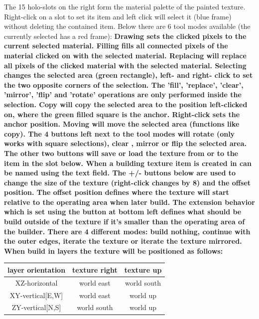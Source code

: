 \documentclass[11pt]{article} %
\begin{document}
The 15 holo-slots on the right form the material palette of the painted texture. Right-click on a slot to set its item and left click will select it (blue frame) without deleting the contained item. Below there are 6 tool modes available (the currently selected has a red frame): \bf Drawing \rm sets the clicked pixels to the current selected material. \bf Filling \rm fills all connected pixels of the material clicked on with the selected material. \bf Replacing \rm will replace all pixels of the clicked material with the selected material. \bf Selecting \rm changes the selected area (green rectangle), left- and right- click to set the two opposite corners of the selection. The 'fill', 'replace', 'clear', 'mirror', 'flip' and 'rotate' operations are only performed inside the selection. \bf Copy \rm will copy the selected area to the position left-clicked on, where the green filled square is the anchor. Right-click sets the anchor position. \bf Moving \rm will move the selected area (functions like copy). The 4 buttons left next to the tool modes will \bf rotate \rm (only works with square selections), \bf clear \rm , \bf mirror \rm or \bf flip \rm the selected area. The other two buttons will save or load the texture from or to the item in the slot below. When a building texture item is created in can be named using the text field. The +/- buttons below are used to change the size of the texture (right-click changes by 8) and the offset position. The offset position defines where the texture will start relative to the operating area when later build. The \bf extension behavior \rm which is set using the button at bottom left defines what should be build outside of the texture if it's smaller than the operating area of the builder. There are 4 different modes: build nothing, continue with the outer edges, iterate the texture or iterate the texture mirrored. \\
When build in layers the texture will be positioned as follows: \\
\begin{tabular}{| c | c | c |} \hline
\bf layer orientation & \bf texture right & \bf texture up \\ \hline
XZ-horizontal & world east & world south \\
XY-vertical[E,W] & world east & world up \\
ZY-vertical[N,S] & world south & world up \\ \hline
\end{tabular} \\
\end{document}
